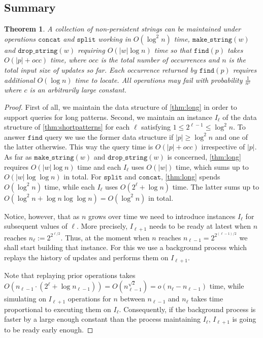 \documentclass[a4paper]{article}
\newtheorem{theorem}{Theorem}[section]
\theoremstyle{remark}
\newcommand{\makeop}{\mathtt{make\_string}}
\newcommand{\dropop}{\mathtt{drop\_string}}
\newcommand{\concop}{\mathtt{concat}}
\newcommand{\splitop}{\mathtt{split}}
\newcommand{\findop}{\mathtt{find}}
\begin{document}
\subsection{Summary}


\begin{theorem}
A collection of non-persistent strings can be maintained under operations $\concop$ and $\splitop$
working in $O(\log^2 n)$ time, $\makeop(w)$ and $\dropop(w)$ requiring $O(|w|\log n)$ time
so that $\findop(p)$ takes $O(|p|+occ)$ time, where $occ$ is the total number of occurrences and $n$ is the total input size of updates so far.
Each occurrence returned by $\findop(p)$ requires additional $O(\log n)$ time to locate.
All operations may fail with probability $\frac{1}{n^c}$ where $c$ is an arbitrarily large constant.
\end{theorem}

\begin{proof}
First of all, we maintain the data structure of \cref{thm:long} in order to support queries for long patterns.
Second, we maintain an instance $I_\ell$ of the data structure of \cref{thm:shortpatterns} for each $\ell$ satisfying
$1\le 2^{\ell-1} \le \log^2 n$.
To answer $\findop$ query we use the former data structure if $|p|\ge \log^2 n$ and
one of the latter otherwise. This way the query time is $O(|p|+occ)$ irrespective of $|p|$.
As far as $\makeop(w)$ and $\dropop(w)$ is concerned, \cref{thm:long} requires $O(|w|\log n)$ time
and each $I_\ell$ uses $O(|w|)$ time, which sums up to $O(|w|\log\log n)$ in total.
For $\splitop$ and $\concop$, \cref{thm:long} spends $O(\log^2 n)$ time, while each $I_\ell$ uses $O(2^\ell+\log n)$ time.
The latter sums up to $O(\log^2n + \log n \log \log n) = O(\log^2 n)$ in total.

Notice, however, that as $n$ grows over time we need to introduce instances $I_\ell$ for subsequent values of $\ell$.
More precisely, $I_{\ell+1}$ needs to be ready at latest when $n$ reaches $n_{\ell}:=2^{2^{\ell/2}}$.
Thus, at the moment when $n$ reaches $n_{\ell-1}=2^{2^{(\ell-1)/2}}$ we shall start building that instance.
For this we use a background process which replays the history of updates and performs them on $I_{\ell+1}$.

Note that replaying prior operations takes $O(n_{\ell-1}\cdot (2^\ell+\log n_{\ell-1}))=O(n_{\ell-1}^{\sqrt{2}})=o(n_{\ell}-n_{\ell-1})$ time,
while simulating on $I_{\ell+1}$ operations for $n$ between $n_{\ell-1}$ and $n_{\ell}$ takes time proportional to executing
them on $I_{\ell}$. Consequently, if the background process is faster by a large enough constant than the process
maintaining $I_{\ell}$, $I_{\ell+1}$ is going to be ready early enough.
\end{proof}
\end{document}
